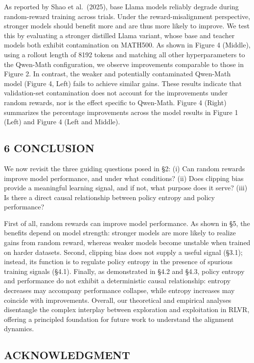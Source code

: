 \documentclass[
  10
]{article}
\begin{document}
As reported by Shao et al.~(2025), base Llama models reliably degrade
during random-reward training across trials. Under the
reward-misalignment perspective, stronger models should benefit more and
are thus more likely to improve. We test this by evaluating a stronger
distilled Llama variant, whose base and teacher models both exhibit
contamination on MATH500. As shown in Figure 4 (Middle), using a rollout
length of 8192 tokens and matching all other hyperparameters to the
Qwen-Math configuration, we observe improvements comparable to those in
Figure 2. In contrast, the weaker and potentially contaminated Qwen-Math
model (Figure 4, Left) fails to achieve similar gains. These results
indicate that validation-set contamination does not account for the
improvements under random rewards, nor is the effect specific to
Qwen-Math. Figure 4 (Right) summarizes the percentage improvements
across the model results in Figure 1 (Left) and Figure 4 (Left and
Middle).

\subsection{6 CONCLUSION}\label{conclusion}

We now revisit the three guiding questions posed in §2: (i) Can random
rewards improve model performance, and under what conditions? (ii) Does
clipping bias provide a meaningful learning signal, and if not, what
purpose does it serve? (iii) Is there a direct causal relationship
between policy entropy and policy performance?

First of all, random rewards can improve model performance. As shown in
§5, the benefits depend on model strength: stronger models are more
likely to realize gains from random reward, whereas weaker models become
unstable when trained on harder datasets. Second, clipping bias does not
supply a useful signal (§3.1); instead, its function is to regulate
policy entropy in the presence of spurious training signals (§4.1).
Finally, as demonstrated in §4.2 and §4.3, policy entropy and
performance do not exhibit a deterministic causal relationship: entropy
decreases may accompany performance collapse, while entropy increases
may coincide with improvements. Overall, our theoretical and empirical
analyses disentangle the complex interplay between exploration and
exploitation in RLVR, offering a principled foundation for future work
to understand the alignment dynamics.

\subsection{ACKNOWLEDGMENT}\label{acknowledgment}
\end{document}
